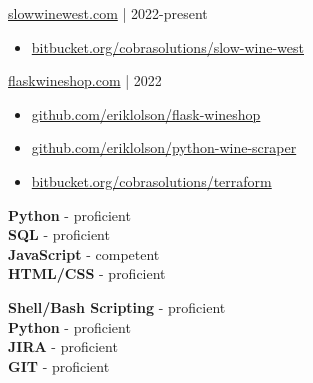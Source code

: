 \documentclass[9pt]{developercv} %
\begin{document}
\begin{minipage}[t]{0.45\textwidth}
	{\href{https://slowwinewest.com}{slowwinewest.com}} | {2022-present}
		\begin{itemize}
   			\item {\href{https://bitbucket.org/cobrasolutions/slow-wine-west}{bitbucket.org/cobrasolutions/slow-wine-west}}
		\end{itemize}
\end{minipage}%
\hfill
\begin{minipage}[t]{0.45\textwidth}
		{\href{https://flaskwineshop.com}{flaskwineshop.com}} | {2022}
            \begin{itemize}
                \item {\href{https://github.com/eriklolson/flask-wineshop}{github.com/eriklolson/flask-wineshop}}
                \item {\href{https://github.com/eriklolson/python-wine-scraper}{github.com/eriklolson/python-wine-scraper}}
                \item {\href{https://bitbucket.org/cobrasolutions/terraform}{bitbucket.org/cobrasolutions/terraform}}
            \end{itemize}
            
\end{minipage}%
	\vspace{34pt}
\begin{minipage}[t]{0.3\textwidth}
	\vspace{-\baselineskip} %

	\textbf{Python} - proficient\\
	\textbf{SQL} - proficient\\
	\textbf{JavaScript} - competent\\
	\textbf{HTML/CSS} - proficient\\
\end{minipage}
\hfill
\begin{minipage}[t]{0.3\textwidth}
	\vspace{-\baselineskip} %
	
	\textbf{Shell/Bash Scripting} - proficient\\
	\textbf{Python} - proficient\\
	\textbf{JIRA} - proficient\\
	\textbf{GIT} - proficient\\
\end{minipage}
\end{document}
